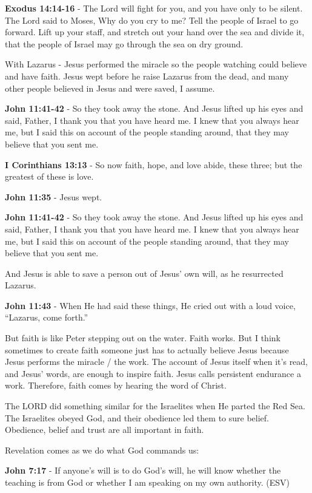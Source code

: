 \documentclass[11pt]{article}
\begin{document}
\textbf{Exodus 14:14-16} - The Lord will fight for you, and you have only to be silent.  The Lord said to Moses, Why do you cry to me? Tell the people of Israel to go forward.  Lift up your staff, and stretch out your hand over the sea and divide it, that the people of Israel may go through the sea on dry ground.

With Lazarus - Jesus performed the miracle so the people watching could believe and have faith.
Jesus wept before he raise Lazarus from the dead, and many other people believed in Jesus and were saved, I assume.

\textbf{John 11:41-42} - So they took away the stone. And Jesus lifted up his eyes and said, Father, I thank you that you have heard me. I knew that you always hear me, but I said this on account of the people standing around, that they may believe that you sent me.

\textbf{I Corinthians 13:13} - So now faith, hope, and love abide, these three; but the greatest of these is love.

\textbf{John 11:35} - Jesus wept.

\textbf{John 11:41-42} - So they took away the stone. And Jesus lifted up his eyes and said, Father, I thank you that you have heard me. I knew that you always hear me, but I said this on account of the people standing around, that they may believe that you sent me.

And Jesus is able to save a person out of Jesus' own will, as he resurrected Lazarus.

\textbf{John 11:43} - When He had said these things, He cried out with a loud voice, “Lazarus, come forth.”

But faith is like Peter stepping out on the water. Faith works. But I think sometimes to create faith someone just has to actually believe Jesus because Jesus performs the miracle / the work. The account of Jesus itself when it's read, and Jesus' words, are enough to inspire faith. Jesus calls persistent endurance a work. Therefore, faith comes by hearing the word of Christ.

The LORD did something similar for the Israelites when He parted the Red Sea.
The Israelites obeyed God, and their obedience led them to sure belief.
Obedience, belief and trust are all important in faith.

Revelation comes as we do what God commands us:

\textbf{John 7:17} - If anyone's will is to do God's will, he will know whether the teaching is from God or whether I am speaking on my own authority. (ESV)
\end{document}

